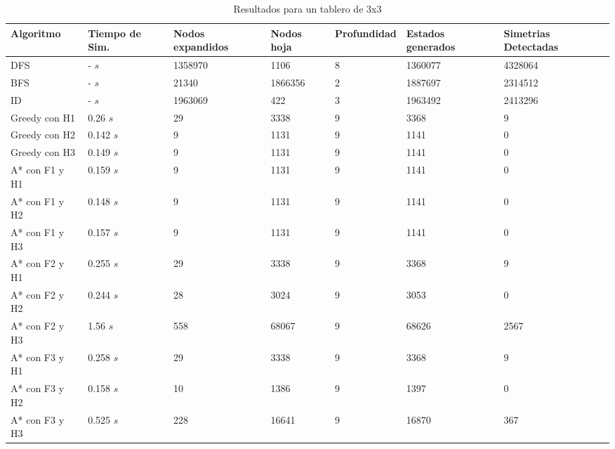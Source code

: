 \documentclass[11pt,twocolumn]{article}
\begin{document}
        \begin{table}[htdp]
        \caption{Resultados para un tablero de 3x3}
                \begin{center}
    				\begin{tabular}{|C{3cm}|C{2cm}|C{2cm}|C{2cm}|C{1.5cm}|C{2cm}|C{2cm}|} \hline
    					Algoritmo & Tiempo de Sim. & Nodos expandidos & Nodos hoja & Profundidad & Estados generados & Simetrias Detectadas \\ \hline\hline
    					DFS & - $s$ & 1358970 & 1106 & 8 & 1360077 & 4328064 \\ \hline
                        BFS & - $s$ & 21340 & 1866356 & 2 & 1887697 & 2314512 \\ \hline
                        ID & - $s$ & 1963069 & 422 & 3 & 1963492 & 2413296 \\ \hline
                        Greedy con H1 & 0.26 $s$ & 29 & 3338 & 9 & 3368 & 9  \\ \hline
                        Greedy con H2 & 0.142 $s$ & 9 & 1131 & 9 & 1141 & 0  \\ \hline
                        Greedy con H3 & 0.149 $s$ & 9 & 1131 & 9 & 1141 & 0  \\ \hline
                        A* con F1 y H1 & 0.159 $s$ & 9 & 1131 & 9 & 1141 & 0  \\ \hline
                        A* con F1 y H2 & 0.148 $s$ & 9 & 1131 & 9 & 1141 & 0  \\ \hline
                        A* con F1 y H3 & 0.157 $s$ & 9 & 1131 & 9 & 1141 & 0  \\ \hline
                        A* con F2 y H1 & 0.255 $s$ & 29 & 3338 & 9 & 3368 & 9  \\ \hline
                        A* con F2 y H2 & 0.244 $s$ & 28 & 3024 & 9 & 3053 & 0  \\ \hline
                        A* con F2 y H3 & 1.56 $s$ & 558 & 68067 & 9 & 68626 & 2567  \\ \hline
                        A* con F3 y H1 & 0.258 $s$ & 29 & 3338 & 9 & 3368 & 9  \\ \hline
                        A* con F3 y H2 & 0.158 $s$ & 10 & 1386 & 9 & 1397 & 0  \\ \hline
                        A* con F3 y H3 & 0.525 $s$ & 228 & 16641 & 9 & 16870 & 367  \\ \hline
    				\end{tabular}
    			\end{center}
                \label{table:3x3}
    	\end{table}
\end{document}
